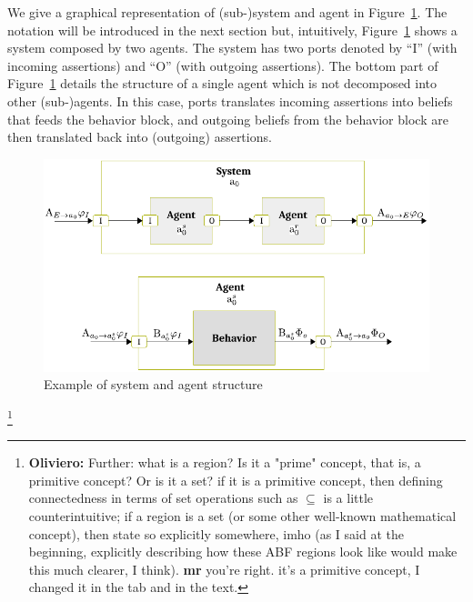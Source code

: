 \documentclass[conference]{IEEEtran}
\newcommand{\fixnote}[2]{\textbf{\color{red}{FIX}}\footnote{{\bf #1:} #2}}
\begin{document}
We give a graphical representation of (sub-)system and agent in Figure~\ref{fig:system-agent}.
The notation will be introduced in the next section but, intuitively,
Figure~\ref{fig:system-agent} shows a system composed by two agents. The system
has two ports denoted by ``I'' (with incoming assertions) and ``O'' (with outgoing assertions).
The bottom part of Figure~\ref{fig:system-agent} details the structure of a single
agent which is not decomposed into other (sub-)agents. In this case, ports translates
incoming assertions into beliefs that feeds the behavior block, and outgoing beliefs
from the behavior block are then translated back into (outgoing) assertions.

\begin{figure}[t]
	\centering
	\includegraphics[width=.9\columnwidth]{system-agent.pdf}
	\caption{Example of system and agent structure}
	\label{fig:system-agent}
\end{figure}

\fixnote{Oliviero}{Further: what is a region? Is it a "prime" concept, that is, a primitive concept? Or is it a set? if it is a primitive concept, then defining connectedness in terms of set operations such as $\subseteq$ is a little counterintuitive; if a region is a set (or some other well-known mathematical concept), then state so explicitly somewhere, imho (as I said at the beginning, explicitly describing how these ABF regions look like would make this much clearer, I think). {\bf mr} you're right. it's a primitive concept, I changed it in the tab and in the text.}
\end{document}
